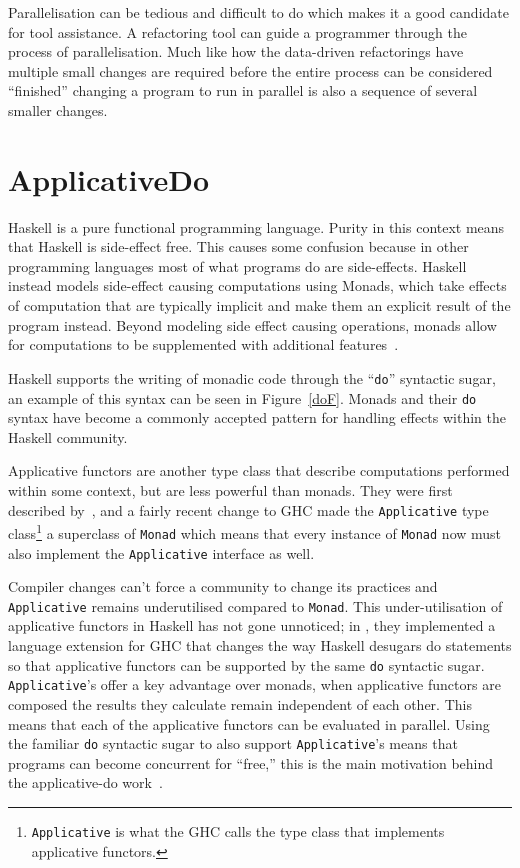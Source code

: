 Parallelisation can be tedious and difficult to do which makes it a good candidate for tool assistance. A refactoring tool can guide a programmer through the process of parallelisation. Much like how the data-driven refactorings have multiple small changes are required before the entire process can be considered ``finished'' changing a program to run in parallel is also a sequence of several smaller changes.

\section{ApplicativeDo}\label{applicativeDo}

Haskell is a pure functional programming language. Purity in this context means that Haskell is side-effect free. This causes some confusion because in other programming languages most of what programs do are side-effects. Haskell instead models side-effect causing computations using Monads, which take effects of computation that are typically implicit and make them an explicit result of the program instead. Beyond modeling side effect causing operations, monads allow for computations to be supplemented with additional features~\citep{haskellWikiMonad}.

Haskell supports the writing of monadic code through the ``\texttt{do}'' syntactic sugar, an example of this syntax can be seen in Figure~\ref{doF}. Monads and their \texttt{do} syntax have become a commonly accepted pattern for handling effects within the Haskell community. 

Applicative functors are another type class that describe computations performed within some context, but are less powerful than monads. They were first described by~\cite{mcbrideIdioms}, and a fairly recent change to GHC made the \texttt{Applicative} type class\footnote{\texttt{Applicative} is what the GHC calls the type class that implements applicative functors.} a superclass of \texttt{Monad} which means that every instance of \texttt{Monad} now must also implement the \texttt{Applicative} interface as well.   

Compiler changes can't force a community to change its practices and \texttt{Applicative} remains underutilised compared to \texttt{Monad}. This under-utilisation of applicative functors in Haskell has not gone unnoticed; in \cite{applicativeDo}, they implemented a language extension for GHC that changes the way Haskell desugars do statements so that applicative functors can be supported by the same \texttt{do} syntactic sugar. \texttt{Applicative}'s offer a key advantage over monads, when applicative functors are composed the results they calculate remain independent of each other. This means that each of the applicative functors can be evaluated in parallel. Using the familiar \texttt{do} syntactic sugar to also support \texttt{Applicative}'s means that programs can become concurrent for ``free,'' this is the main motivation behind the applicative-do work~\citep{applicativeDo}.


